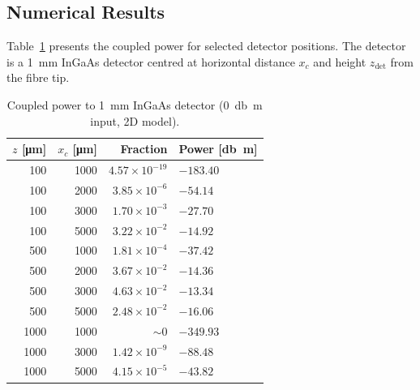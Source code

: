 \subsection{Numerical Results}

Table~\ref{tab:results} presents the coupled power for selected detector
positions.  The detector is a \SI{1}{\milli\metre} InGaAs detector
centred at horizontal distance $x_c$ and height $z_\text{det}$ from the
fibre tip.

\begin{table}[h]
\centering
\caption{Coupled power to \SI{1}{\milli\metre} InGaAs detector
  (\SI{0}{\decibel m} input, 2D model).}
\label{tab:results}
\begin{tabular}{@{}rrrl@{}}
\toprule
$z$ [\si{\micro\metre}] & $x_c$ [\si{\micro\metre}]
  & Fraction & Power [\si{\decibel m}] \\
\midrule
100  & 1000 & $4.57\times10^{-19}$ & $-183.40$ \\
100  & 2000 & $3.85\times10^{-6}$  & $-54.14$  \\
100  & 3000 & $1.70\times10^{-3}$  & $-27.70$  \\
100  & 5000 & $3.22\times10^{-2}$  & $-14.92$  \\
500  & 1000 & $1.81\times10^{-4}$  & $-37.42$  \\
500  & 2000 & $3.67\times10^{-2}$  & $-14.36$  \\
500  & 3000 & $4.63\times10^{-2}$  & $-13.34$  \\
500  & 5000 & $2.48\times10^{-2}$  & $-16.06$  \\
1000 & 1000 & ${\sim}0$            & $-349.93$ \\
1000 & 3000 & $1.42\times10^{-9}$  & $-88.48$  \\
1000 & 5000 & $4.15\times10^{-5}$  & $-43.82$  \\
\bottomrule
\end{tabular}
\end{table}

